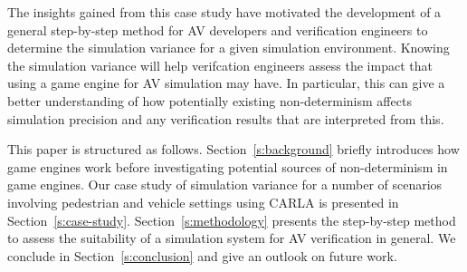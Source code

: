 \documentclass[letterpaper, 10 pt, journal, twoside]{IEEEtran}
\begin{document}
The insights gained from this case study have motivated the development of a general step-by-step method for AV developers and verification engineers to determine the simulation variance for a given simulation environment. 
%
%
Knowing the simulation variance will help verifcation engineers assess the impact that using a game engine for AV simulation may have. In particular, this can give a better understanding of how potentially existing non-determinism affects simulation precision and any verification results that are interpreted from this.
%
%
%
%

This paper is structured as follows.
%
Section~\ref{s:background} briefly introduces how game engines work before investigating potential sources of non-determinism in game engines.
%
Our case study of simulation variance for a number of scenarios involving pedestrian and vehicle settings using CARLA is presented in Section~\ref{s:case-study}.
%
Section~\ref{s:methodology} presents the step-by-step method to assess the suitability of a simulation system for AV verification in general. 
%
We conclude in Section~\ref{s:conclusion} and give an outlook on future work.


\end{document}
